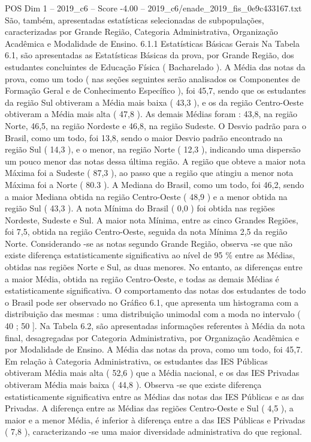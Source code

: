 \begin{textsample}{POS Dim 1 – 2019\_c6 – Score -4.00 – 2019\_c6/enade\_2019\_fis\_0e9c433167.txt}
São, também, apresentadas estatísticas selecionadas de subpopulações, caracterizadas por Grande Região, Categoria Administrativa, Organização Acadêmica e Modalidade de Ensino. 6.1.1 Estatísticas Básicas Gerais Na Tabela 6.1, são apresentadas as Estatísticas Básicas da prova, por Grande Região, dos estudantes concluintes de Educação Física ( Bacharelado ).
A Média das notas da prova, como um todo ( nas seções seguintes serão analisados os Componentes de Formação Geral e de Conhecimento Específico ), foi 45,7, sendo que os estudantes da região Sul obtiveram a Média mais baixa ( 43,3 ), e os da região Centro-Oeste obtiveram a Média mais alta ( 47,8 ).
As demais Médias foram : 43,8, na região Norte, 46,5, na região Nordeste e 46,8, na região Sudeste.
O Desvio padrão para o Brasil, como um todo, foi 13,8, sendo o maior Desvio padrão encontrado na região Sul ( 14,3 ), e o menor, na região Norte ( 12,3 ), indicando uma dispersão um pouco menor das notas dessa última região.
A região que obteve a maior nota Máxima foi a Sudeste ( 87,3 ), ao passo que a região que atingiu a menor nota Máxima foi a Norte ( 80.3 ).
A Mediana do Brasil, como um todo, foi 46,2, sendo a maior Mediana obtida na região Centro-Oeste ( 48,9 ) e a menor obtida na região Sul ( 43,3 ).
A nota Mínima do Brasil ( 0,0 ) foi obtida nas regiões Nordeste, Sudeste e Sul.
A maior nota Mínima, entre as cinco Grandes Regiões, foi 7,5, obtida na região Centro-Oeste, seguida da nota Mínima 2,5 da região Norte.
Considerando -se as notas segundo Grande Região, observa -se que não existe diferença estatisticamente significativa ao nível de 95 \% entre as Médias, obtidas nas regiões Norte e Sul, as duas menores.
No entanto, as diferenças entre a maior Média, obtida na região Centro-Oeste, e todas as demais Médias é estatisticamente significativa.
O comportamento das notas dos estudantes de todo o Brasil pode ser observado no Gráfico 6.1, que apresenta um histograma com a distribuição das mesmas : uma distribuição unimodal com a moda no intervalo ( 40 ; 50 ].
Na Tabela 6.2, são apresentadas informações referentes à Média da nota final, desagregadas por Categoria Administrativa, por Organização Acadêmica e por Modalidade de Ensino.
A Média das notas da prova, como um todo, foi 45,7.
Em relação à Categoria Administrativa, os estudantes das IES Públicas obtiveram Média mais alta ( 52,6 ) que a Média nacional, e os das IES Privadas obtiveram Média mais baixa ( 44,8 ).
Observa -se que existe diferença estatisticamente significativa entre as Médias das notas das IES Públicas e as das Privadas.
A diferença entre as Médias das regiões Centro-Oeste e Sul ( 4,5 ), a maior e a menor Média, é inferior à diferença entre a das IES Públicas e Privadas ( 7,8 ), caracterizando -se uma maior diversidade administrativa do que regional.

\end{textsample}
